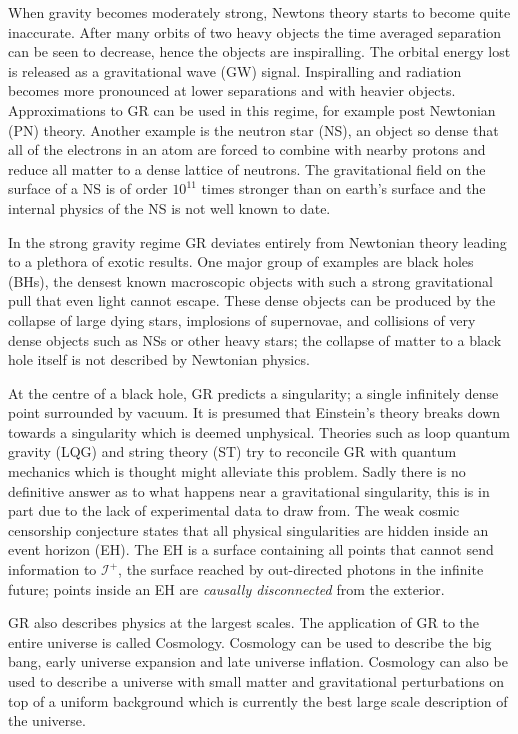 When gravity becomes moderately strong, Newtons theory starts to become quite inaccurate. After many orbits of two heavy objects the time averaged separation can be seen to decrease, hence the objects are inspiralling. The orbital energy lost is released as a gravitational wave (GW) signal. Inspiralling and radiation becomes more pronounced at lower separations and with heavier objects. Approximations to GR can be used in this regime, for example post Newtonian (PN) theory. Another example is the neutron star (NS), an object so dense that all of the electrons in an atom are forced to combine with nearby protons and reduce all matter to a dense lattice of neutrons. The gravitational field on the surface of a NS is of order $10^{11}$ times stronger than on earth's surface and the internal physics of the NS is not well known to date.

In the strong gravity regime GR deviates entirely from Newtonian theory leading to a plethora of exotic results. One major group of examples are black holes (BHs), the densest known macroscopic objects with such a strong gravitational pull that even light cannot escape. These dense objects can be produced by the collapse of large dying stars, implosions of supernovae, and collisions of very dense objects such as NSs or other heavy stars; the collapse of matter to a black hole itself is not described by Newtonian physics.

At the centre of a black hole, GR predicts a singularity; a single infinitely dense point surrounded by vacuum. It is presumed that Einstein's theory breaks down towards a singularity which is deemed unphysical. Theories such as loop quantum gravity (LQG) and string theory (ST) try to reconcile GR with quantum mechanics which is thought might alleviate this problem. Sadly there is no definitive answer as to what happens near a gravitational singularity, this is in part due to the lack of experimental data to draw from. The weak cosmic censorship conjecture states that all physical singularities are hidden inside an event horizon (EH). The EH is a surface containing all points that cannot send information to $\mathcal{I}^+$, the surface reached by out-directed photons in the infinite future; points inside an EH are {\it causally disconnected} from the exterior. 

GR also describes physics at the largest scales. The application of GR to the entire universe is called Cosmology. Cosmology can be used to describe the big bang, early universe expansion and late universe inflation. Cosmology can also be used to describe a universe with small matter and gravitational perturbations on top of a uniform background which is currently the best large scale description of the universe.


